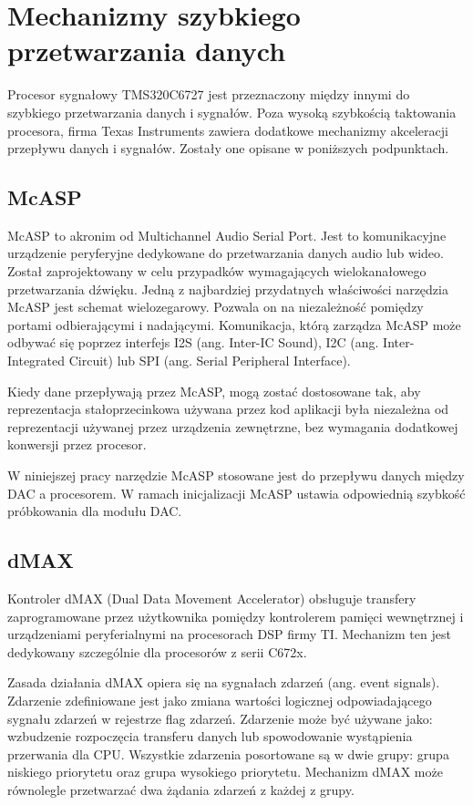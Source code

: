 \section{Mechanizmy szybkiego przetwarzania danych}
Procesor sygnałowy TMS320C6727 jest przeznaczony między innymi do szybkiego przetwarzania danych i sygnałów. Poza wysoką szybkością taktowania procesora, firma Texas Instruments zawiera dodatkowe mechanizmy akceleracji przepływu danych i sygnałów. Zostały one opisane w poniższych podpunktach.

\subsection{McASP}
McASP to akronim od Multichannel Audio Serial Port. Jest to komunikacyjne urządzenie peryferyjne dedykowane do przetwarzania danych audio lub wideo. Został zaprojektowany w celu przypadków wymagających wielokanałowego przetwarzania dźwięku. Jedną z najbardziej przydatnych właściwości narzędzia McASP jest schemat wielozegarowy. Pozwala on na niezależność pomiędzy portami odbierającymi i nadającymi. Komunikacja, którą zarządza McASP może odbywać się poprzez interfejs I2S (ang. Inter-IC Sound), I2C (ang. Inter-Integrated Circuit) lub SPI (ang. Serial Peripheral Interface).

Kiedy dane przepływają przez McASP, mogą zostać dostosowane tak, aby reprezentacja stałoprzecinkowa używana przez kod aplikacji była niezależna od reprezentacji używanej przez urządzenia zewnętrzne, bez wymagania dodatkowej konwersji przez procesor.

W niniejszej pracy narzędzie McASP stosowane jest do przepływu danych między DAC a procesorem. W ramach inicjalizacji McASP ustawia odpowiednią szybkość próbkowania dla modułu DAC.

\subsection{dMAX}
Kontroler dMAX (Dual Data Movement Accelerator) obsługuje transfery zaprogramowane przez użytkownika pomiędzy kontrolerem pamięci wewnętrznej i urządzeniami peryferialnymi na procesorach DSP firmy TI. Mechanizm ten jest dedykowany szczególnie dla procesorów z serii C672x.

Zasada działania dMAX opiera się na sygnałach zdarzeń (ang. event signals). Zdarzenie zdefiniowane jest jako zmiana wartości logicznej odpowiadającego sygnału zdarzeń w rejestrze flag zdarzeń. Zdarzenie może być używane jako: wzbudzenie rozpoczęcia transferu danych lub spowodowanie wystąpienia przerwania dla CPU. Wszystkie zdarzenia posortowane są w dwie grupy: grupa niskiego priorytetu oraz grupa wysokiego priorytetu. Mechanizm dMAX może równolegle przetwarzać dwa żądania zdarzeń z każdej z grupy.

